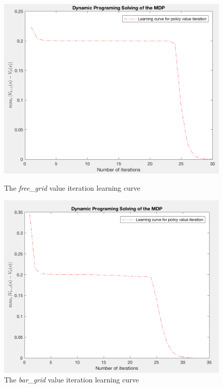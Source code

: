 \documentclass[a4paper]{report}
\begin{document}
{{{				\begin{figure}[h!]
				\begin{minipage}{0.45\linewidth}
					\includegraphics[width=\linewidth]{free_grid_bellman_lc}
					\caption{The \emph{free\_grid} value iteration learning curve}
				\end{minipage}
				\hfill
				\begin{minipage}{0.45\linewidth}
					\includegraphics[width=\linewidth]{bar_grid_bellman_lc}
					\caption{The \emph{bar\_grid} value iteration learning curve}
				\end{minipage}
				\end{figure}
				
}}}
\end{document}
